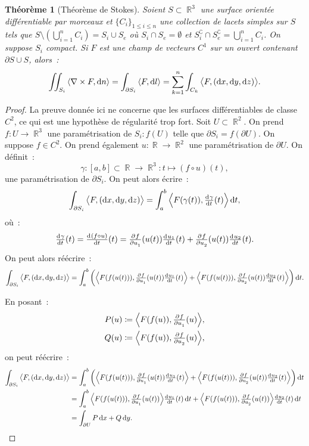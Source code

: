 \documentclass{article}
\DeclareMathOperator{\R}{\mathbb R}
\newcommand{\scpr}[2]{{\left\langle#1, #2\right\rangle}}
\newcommand{\rot}[1]{\nabla \times #1}
\newcommand{\diffvec}[3]{\left(\dif #1, \dif #2, \dif #3\right)}
\newcommand{\difxyz}{\diffvec xyz}
\newtheorem{thm}{Théorème}[section]
\theoremstyle{definition}
\theoremstyle{remark}
\begin{document}
		\begin{thm}[Théorème de Stokes] Soient $S \subset \R^3$ une surface orientée différentiable par morceaux et $\{C_i\}_{1 \leq i \leq n}$ une collection
		de lacets simples sur $S$ tels que $S \setminus \left(\bigcup_{i=1}^nC_i\right) = S_i \cup S_e$ où $S_i \cap S_e = \emptyset$ et
		$S_i^\complement \cap S_e^\complement = \bigcup_{i=1}^nC_i$. On suppose $S_i$ compact.
		Si $F$ est une champ de vecteurs $C^1$ sur un ouvert contenant $\partial S \cup S$, alors~:
		\[\iint_{S_i}\scpr {\rot F}{\dif n} = \int_{\partial S_i} \scpr F{\dif l} = \sum_{k=1}^n\int_{C_k}\scpr F{\difxyz}.\]
		\end{thm}

		\begin{proof} La preuve donnée ici ne concerne que les surfaces différentiables de classe $C^2$, ce qui est une hypothèse de régularité trop fort.
		Soit $U \subset \R^2$. On prend $f : U \to \R^3$ une paramétrisation de $S_i : f(U)$ telle que $\partial S_i = f(\partial U)$. On suppose
		$f \in C^2$. On prend également $u : \R \to \R^2$ une paramétrisation de $\partial U$. On définit~:
		\[\gamma : [a, b] \subset \R \to \R^3 : t \mapsto (f \circ u)(t),\]
		une paramétrisation de $\partial S_i$. On peut alors écrire~:
		\[\int_{\partial S_i}\scpr F{\difxyz} = \int_a^b\scpr{F(\gamma(t))}{\od \gamma t(t)}\dif t,\]
		où~:
		\[\od \gamma t(t) = \od {(f \circ u)}t(t) = \pd f{u_1}(u(t))\od {u_1}t(t) + \pd f{u_2}(u(t))\od {u_2}t(t).\]
		On peut alors réécrire~:
		\[\int_{\partial S_i}\scpr F{\difxyz}
		= \int_a^b\left(\scpr {F(f(u(t)))}{\pd f{u_1}(u(t))\od {u_1}t(t)} + \scpr{F(f(u(t)))}{\pd f{u_2}(u(t))\od {u_2}t(t)}\right)\dif t.\]

		En posant~:
		\begin{align*}
			P(u) &\coloneqq \scpr {F(f(u))}{\pd f{u_1}(u)}, \\
			Q(u) &\coloneqq \scpr {F(f(u))}{\pd f{u_2}(u)},
		\end{align*}
		on peut réécrire~:
		\begin{align*}
			\int_{\partial S_i}\scpr F{\difxyz}
			&= \int_a^b\left(\scpr {F(f(u(t)))}{\pd f{u_1}(u(t))\od {u_1}t(t)} + \scpr{F(f(u(t)))}{\pd f{u_2}(u(t))\od {u_2}t(t)}\right)\dif t \\
			&= \int_a^b\scpr {F(f(u(t)))}{\pd f{u_1}(u(t))}\od {u_1}t(t)\dif t + \scpr{F(f(u(t)))}{\pd f{u_2}(u(t))}\od {u_2}t(t)\dif t \\
			&= \int_{\partial U}P\dif x + Q\dif y.
		\end{align*}


\end{proof}
\end{document}
